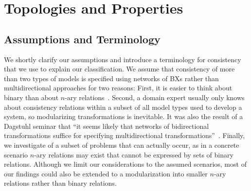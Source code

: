 \chapter{Topologies and Properties}
\label{chap:formalization}

\section{Assumptions and Terminology}
\label{sec:foundations}
\label{sec:foundations:assumptions}
\label{sec:foundations:consistency}

We shortly clarify our assumptions and introduce a terminology for consistency %
that we %
use to explain our classification.
We assume that consistency of more than two types of models is specified using networks of \acp{BX} rather than multidirectional approaches for two reasons:
First, it is easier to think about binary than about $n$-ary relations~\cite{stevens2017a}.
Second, a domain expert usually only knows about consistency relations within a subset of all model types used to develop a system, so modularizing transformations is inevitable.
It was also the result of a Dagstuhl seminar that \enquote{it seems likely that networks of bidirectional transformations suffice for specifying multidirectional transformations}~\cite[p. 7]{cleve2019dagstuhl}.
Finally, we investigate of a subset of problems that can actually occur, as in a concrete scenario $n$-ary relations may exist that cannot be expressed by sets of binary relations.
Although we limit our considerations to the assumed scenarios, most of our findings could also be extended to a modularization into smaller $n$-ary relations rather than binary relations.

